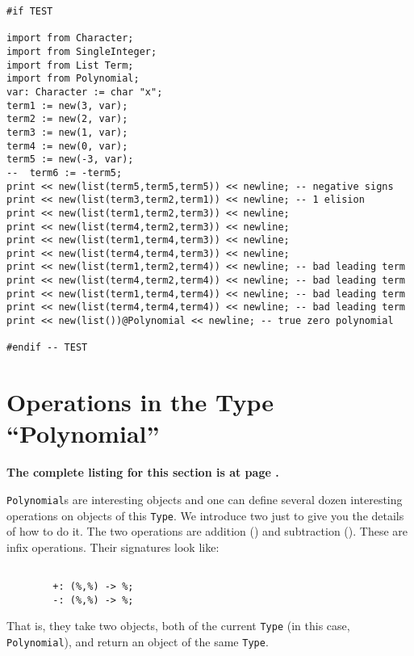 \begin{small}
\begin{verbatim}
#if TEST

import from Character;
import from SingleInteger;
import from List Term;
import from Polynomial;
var: Character := char "x";
term1 := new(3, var);
term2 := new(2, var);
term3 := new(1, var);
term4 := new(0, var);
term5 := new(-3, var);
--  term6 := -term5;
print << new(list(term5,term5,term5)) << newline; -- negative signs
print << new(list(term3,term2,term1)) << newline; -- 1 elision
print << new(list(term1,term2,term3)) << newline;
print << new(list(term4,term2,term3)) << newline;
print << new(list(term1,term4,term3)) << newline;
print << new(list(term4,term4,term3)) << newline;
print << new(list(term1,term2,term4)) << newline; -- bad leading term
print << new(list(term4,term2,term4)) << newline; -- bad leading term
print << new(list(term1,term4,term4)) << newline; -- bad leading term
print << new(list(term4,term4,term4)) << newline; -- bad leading term
print << new(list())@Polynomial << newline; -- true zero polynomial

#endif -- TEST

\end{verbatim}
\end{small}

\section{Operations in the Type ``Polynomial''}

{\bf The complete listing for this section is at page \pageref{OpsInPolynomialListing}.}

\verb"Polynomial"s are interesting objects and one can define several dozen
interesting operations on objects of this \verb"Type". We introduce two just
to give you the details of how to do it. The two operations are
addition (\ttin{+}) and subtraction (\ttin{-}). These are infix operations.
Their signatures look like:

\begin{small}
\begin{verbatim}

        +: (%,%) -> %;
        -: (%,%) -> %;

\end{verbatim}
\end{small}

That is, they take two objects, both of the current \verb"Type" (in this
case, \verb"Polynomial"), and return an object of the same \verb"Type".

